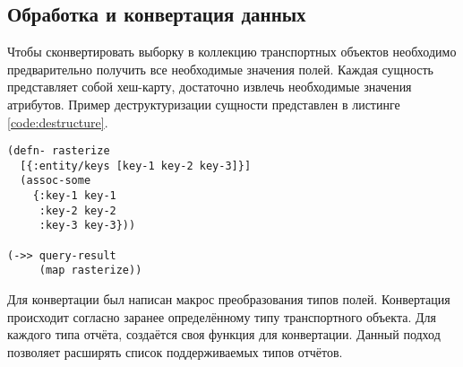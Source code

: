 \subsection{Обработка и конвертация данных}

Чтобы сконвертировать выборку в коллекцию транспортных объектов необходимо предварительно получить все необходимые значения полей. Каждая сущность представляет собой хеш-карту, достаточно извлечь необходимые значения атрибутов. Пример деструктуризации\cite{destructuring} сущности представлен в листинге \ref{code:destructure}.

\begin{lstlisting}[label=code:destructure, caption={Деструктуризация сущности}]
(defn- rasterize
  [{:entity/keys [key-1 key-2 key-3]}]
  (assoc-some
    {:key-1 key-1
     :key-2 key-2
     :key-3 key-3}))
 
(->> query-result
     (map rasterize))
\end{lstlisting}

Для конвертации был написан макрос преобразования типов полей. Конвертация происходит согласно заранее определённому типу транспортного объекта. Для каждого типа отчёта, создаётся своя функция для конвертации. Данный подход позволяет расширять список поддерживаемых типов отчётов.

